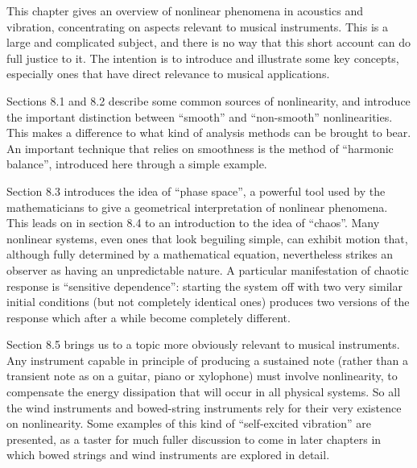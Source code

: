   This chapter gives an overview of nonlinear phenomena in acoustics and 
  vibration, concentrating on aspects relevant to musical instruments. This is 
  a large and complicated subject, and there is no way that this short account 
  can do full justice to it. The intention is to introduce and illustrate some 
  key concepts, especially ones that have direct relevance to musical 
  applications. 

  Sections 8.1 and 8.2 describe some common sources of nonlinearity, and 
  introduce the important distinction between “smooth” and “non-smooth” 
  nonlinearities. This makes a difference to what kind of analysis methods can 
  be brought to bear. An important technique that relies on smoothness is the 
  method of “harmonic balance”, introduced here through a simple example. 

  Section 8.3 introduces the idea of “phase space”, a powerful tool used by the 
  mathematicians to give a geometrical interpretation of nonlinear phenomena. 
  This leads on in section 8.4 to an introduction to the idea of “chaos”. Many 
  nonlinear systems, even ones that look beguiling simple, can exhibit motion 
  that, although fully determined by a mathematical equation, nevertheless 
  strikes an observer as having an unpredictable nature. A particular 
  manifestation of chaotic response is “sensitive dependence”: starting the 
  system off with two very similar initial conditions (but not completely 
  identical ones) produces two versions of the response which after a while 
  become completely different. 

  Section 8.5 brings us to a topic more obviously relevant to musical 
  instruments. Any instrument capable in principle of producing a sustained 
  note (rather than a transient note as on a guitar, piano or xylophone) must 
  involve nonlinearity, to compensate the energy dissipation that will occur in 
  all physical systems. So all the wind instruments and bowed-string 
  instruments rely for their very existence on nonlinearity. Some examples of 
  this kind of “self-excited vibration” are presented, as a taster for much 
  fuller discussion to come in later chapters in which bowed strings and wind 
  instruments are explored in detail. 

